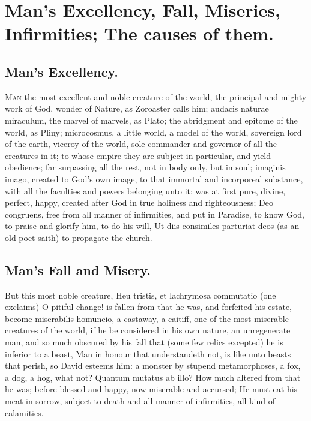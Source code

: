 {%
\section[Man's Excellency, Fall, Miseries]{Man's Excellency, Fall, Miseries, Infirmities; The causes of them.}

\subsection{Man's Excellency.}
\lettrine[image,lines=5,findent=5pt,nindent=0pt]{M}{an} the most excellent and noble creature of the world, the principal and mighty work of God, wonder of Nature, 
as Zoroaster calls him; audacis naturae miraculum, the marvel of marvels,
as Plato; the abridgment and epitome of the world,
as Pliny; microcosmus, a little world, a model of the world, sovereign lord of the earth, viceroy of the world, sole commander and governor of all the creatures in it; to whose empire they are subject in particular, and yield obedience; far surpassing all the rest, not in body only, but in soul; imaginis imago, created to God's own image, to that immortal and incorporeal substance, with all the faculties and powers belonging unto it; was at first pure, divine, perfect, happy, created after God in true holiness and righteousness; Deo congruens, free from all manner of infirmities, and put in Paradise, to know God, to praise and glorify him, to do his will, Ut diis consimiles parturiat deos (as an old poet saith) to propagate the church.

\subsection{Man's Fall and Misery.}
But this most noble creature, Heu tristis, et lachrymosa commutatio (one exclaims) O pitiful change! is fallen from that he was, and forfeited his estate, become miserabilis homuncio, a castaway, a caitiff, one of the most miserable creatures of the world, if he be considered in his own nature, an unregenerate man, and so much obscured by his fall that (some few relics excepted) he is inferior to a beast, Man in honour that understandeth not, is like unto beasts that perish, so David esteems him: a monster by stupend metamorphoses, a fox, a dog, a hog, what not? Quantum mutatus ab illo? How much altered from that he was; before blessed and happy, now miserable and accursed; He must eat his meat in sorrow, subject to death and all manner of infirmities, all kind of calamities.

}
